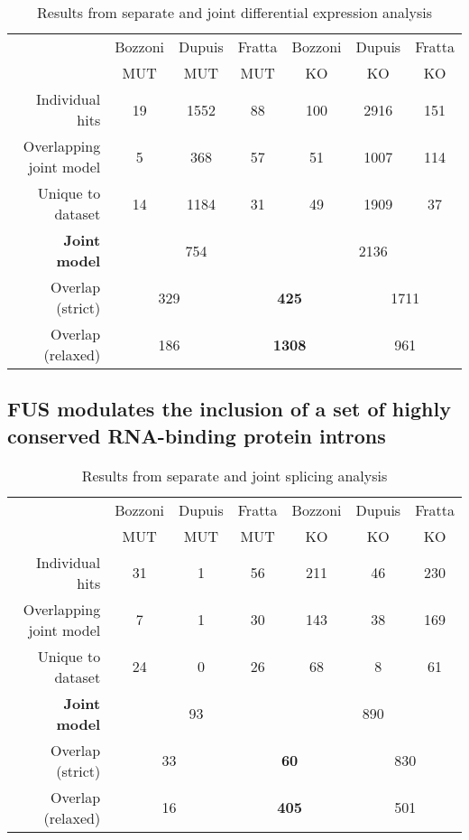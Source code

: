 \begin{table}[h!]
		\begin{tabular}{|r|ccc|ccc|}
			\hline
			& Bozzoni & Dupuis & Fratta & Bozzoni & Dupuis & Fratta\\
			& MUT & MUT & MUT & KO & KO & KO\\
			\hline
			Individual hits                & 19 & 1552 & 88 & 100 & 2916 & 151 \\
			Overlapping joint model & 5 & 368 & 57 & 51 & 1007 & 114 \\
			Unique to dataset          & 14 & 1184 & 31 & 49 & 1909 & 37 \\
			\hline
			\textbf{Joint model}       & \multicolumn{3}{c|}{754} & \multicolumn{3}{c|}{2136} \\
			\hline
			Overlap (strict)              & \multicolumn{2}{c}{329} & \multicolumn{2}{|c|}{\textbf{425}} & \multicolumn{2}{c|}{1711} \\
			Overlap (relaxed)           & \multicolumn{2}{c}{186} & \multicolumn{2}{|c|}{\textbf{1308} } & \multicolumn{2}{c|}{961} \\
			\hline
		\end{tabular}
	\caption{Results from separate and joint differential expression analysis}
	\label{tab:expression_results}
\end{table}




\subsection{FUS modulates the inclusion of a set of highly conserved RNA-binding protein introns}

\begin{table}[h!]
		\begin{tabular}{|r|ccc|ccc|}
			\hline
			& Bozzoni & Dupuis & Fratta & Bozzoni & Dupuis & Fratta\\
			& MUT & MUT & MUT & KO & KO & KO\\
			\hline
			Individual hits                & 31 & 1 & 56 & 211 & 46 & 230 \\
			Overlapping joint model & 7 & 1 & 30 & 143 & 38 & 169 \\
			Unique to dataset          & 24 & 0 & 26 & 68 & 8 & 61 \\
			\hline
			\textbf{Joint model}       & \multicolumn{3}{c|}{93} & \multicolumn{3}{c|}{890} \\
			\hline
			Overlap (strict)              & \multicolumn{2}{c|}{33} & \multicolumn{2}{c|}{\textbf{60}} & \multicolumn{2}{c|}{830} \\
			Overlap (relaxed)           & \multicolumn{2}{c|}{16} & \multicolumn{2}{c|}{\textbf{405} } & \multicolumn{2}{c|}{501} \\
			\hline
		\end{tabular}
	\caption{Results from separate and joint splicing analysis}
	\label{tab:splicing_results}
\end{table}


